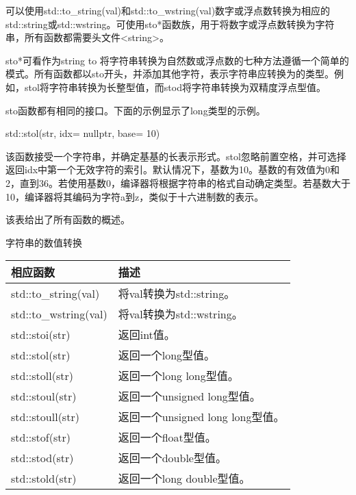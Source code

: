 

可以使用std::to\_string(val)和std::to\_wstring(val)数字或浮点数转换为相应的std::string或std::wstring。可使用sto*函数族，用于将数字或浮点数转换为字符串，所有函数都需要头文件<string>。

\begin{myTip}{sto*可看作为string to}
将字符串转换为自然数或浮点数的七种方法遵循一个简单的模式。所有函数都以sto开头，并添加其他字符，表示字符串应转换为的类型。例如，stol将字符串转换为长整型值，而stod将字符串转换为双精度浮点型值。
\end{myTip}

sto函数都有相同的接口。下面的示例显示了long类型的示例。

\begin{cpp}
std::stol(str, idx= nullptr, base= 10)
\end{cpp}

该函数接受一个字符串，并确定基基的长表示形式。stol忽略前置空格，并可选择返回idx中第一个无效字符的索引。默认情况下，基数为10。基数的有效值为0和2，直到36。若使用基数0，编译器将根据字符串的格式自动确定类型。若基数大于10，编译器将其编码为字符a到z，类似于十六进制数的表示。

该表给出了所有函数的概述。

\begin{center}
字符串的数值转换
\end{center}

\begin{longtable}[c]{|l|l|}
\hline
\textbf{相应函数} & \textbf{描述}                  \\ \hline
\endfirsthead
%
\endhead
%
std::to\_string(val)     & 将val转换为std::string。     \\ \hline
std::to\_wstring(val)    & 将val转换为std::wstring。    \\ \hline
std::stoi(str)           & 返回int值。                \\ \hline
std::stol(str)           & 返回一个long型值。                \\ \hline
std::stoll(str)          & 返回一个long long型值。           \\ \hline
std::stoul(str)          & 返回一个unsigned long型值。      \\ \hline
std::stoull(str)         & 返回一个unsigned long long型值。 \\ \hline
std::stof(str)           & 返回一个float型值。               \\ \hline
std::stod(str)           & 返回一个double型值。              \\ \hline
std::stold(str)          & 返回一个long double型值。        \\ \hline
\end{longtable}


